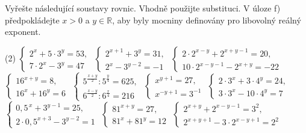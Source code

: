 \documentclass[12pt,a4paper]{article}
\begin{document}
\newpage
\setcounter{section}{3}
\begin{exercise}
Vyřešte následující soustavy rovnic. Vhodně použijte substituci.
V úloze f) předpokládejte $x>0$ a $y\in\mathbb{R}$, aby byly mocniny definovány pro libovolný reálný exponent.

\begin{tasks}(2)
    \task 
    $\begin{cases}
        2^{x} + 5 \cdot 3^{y} = 53,\\[2mm]
        7 \cdot 2^{x} - 3^{y} = 47
    \end{cases}$
    \task
    $\begin{cases}
        2^{x+1} + 3^{y} = 31,\\[2mm]
        2^{x} - 3^{y-2} = -1
    \end{cases}$
    \task
    $\begin{cases}
        2 \cdot 2^{x-y} + 2^{x+y-1} = 20,\\[2mm]
        10 \cdot 2^{x-y-1} - 2^{x+y} = -22
    \end{cases}$
    \task
    $\begin{cases}
        16^{x+y} = 8,\\[2mm]
        16^{x} + 16^{y} = 6
    \end{cases}$
    \task
    $\begin{cases}
        5^{\frac{x+y}{2}} : 5^{\frac{y}{4}} = 625,\\[2mm]
        6^{\frac{x-y}{2}} : 6^{\frac{x}{4}} = 216
    \end{cases}$
    \task
    $\begin{cases}
        x^{y+1} = 27,\\[2mm]
        x^{-y+1} = 3^{-1}
    \end{cases}$
    \task
    $\begin{cases}
        2 \cdot 3^{x} + 3 \cdot 4^{y} = 24,\\[2mm]
        3 \cdot 3^{x} - 10 \cdot 4^{y} = 7
    \end{cases}$
    \task
    $\begin{cases}
        0{,}5^{\,x} + 3^{y-1} = 25,\\[2mm]
        2 \cdot 0{,}5^{x+3} - 3^{y-2} = 1
    \end{cases}$
    \task
    $\begin{cases}
        81^{x+y} = 27,\\[2mm]
        81^{x} + 81^{y} = 12
    \end{cases}$
    \task
    $\begin{cases}
        2^{x+y} + 2^{x-y-1} = 3^{2},\\[2mm]
        2^{x+y+1} - 3 \cdot 2^{x-y+1} = 2^{2}
    \end{cases}$
\end{tasks}

\end{exercise}
\end{document}
